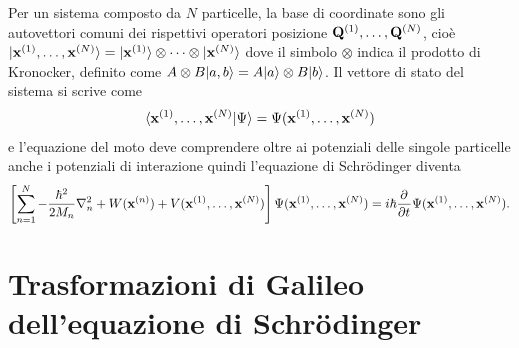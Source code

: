 Per un sistema composto da $ N $ particelle, la base di coordinate sono gli autovettori comuni dei rispettivi operatori posizione 
$ \mathbf{Q}^{(1)}, \dots, \mathbf{Q}^{(N)} $, cioè $ \vert \mathbf{x}^{(1)}, \dots, \mathbf{x}^{(N)} \rangle = \vert \mathbf{x}^{(1)} \rangle \otimes \dots \otimes \vert \mathbf{x}^{(N)} \rangle $ dove il simbolo 
$ \otimes $ indica il prodotto di Kronocker, definito come $ A\otimes B \vert a,b \rangle = A\vert a \rangle \otimes B \vert b \rangle $. Il vettore di stato del sistema si scrive come 
\begin{align*}
  \langle \mathbf{x}^{(1)}, \dots, \mathbf{x}^{(N)} | \Psi \rangle = \Psi(\mathbf{x}^{(1)}, \dots, \mathbf{x}^{(N)})
\end{align*}
e l'equazione del moto deve comprendere oltre ai potenziali delle singole particelle anche i potenziali di interazione quindi l'equazione di Schrödinger 
diventa 
\begin{align*}
  \left[ \sum_{n = 1}^N -\frac{\hbar^2}{2M_n} \nabla_n^2 + W(\mathbf{x}^{(n)}) + V(\mathbf{x}^{(1)}, \dots, \mathbf{x}^{(N)}) \right] 
  \Psi(\mathbf{x}^{(1)}, \dots, \mathbf{x}^{(N)}) = i \hbar \frac{\partial^{} {}}{\partial {t}^{}} \Psi(\mathbf{x}^{(1)}, \dots, \mathbf{x}^{(N)}).
\end{align*}

\section{Trasformazioni di Galileo dell'equazione di Schrödinger}

